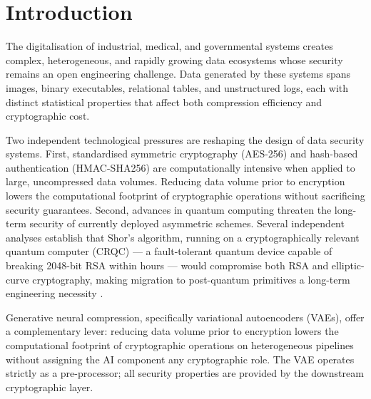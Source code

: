 \documentclass[twocolumn]{article}
\begin{document}
\section{Introduction}

The digitalisation of industrial, medical, and governmental systems creates
complex, heterogeneous, and rapidly growing data ecosystems whose security remains
an open engineering challenge. Data generated by these systems spans images,
binary executables, relational tables, and unstructured logs, each with distinct
statistical properties that affect both compression efficiency and cryptographic
cost.

Two independent technological pressures are reshaping the design of data security
systems. First, standardised symmetric cryptography (AES-256) and hash-based
authentication (HMAC-SHA256) are computationally intensive when applied to large,
uncompressed data volumes. Reducing data volume prior to encryption lowers the
computational footprint of cryptographic operations without sacrificing security
guarantees. Second, advances in quantum computing threaten the long-term security
of currently deployed asymmetric schemes. Several independent analyses establish
that Shor's algorithm, running on a cryptographically relevant quantum computer
(CRQC) --- a fault-tolerant quantum device capable of breaking 2048-bit RSA
within hours --- would compromise both RSA and elliptic-curve cryptography, making
migration to post-quantum primitives a long-term engineering necessity
\cite{natacad2019, bernstein2017}.

Generative neural compression, specifically variational autoencoders (VAEs),
offer a complementary lever: reducing data volume prior to encryption lowers the
computational footprint of cryptographic operations on heterogeneous pipelines
without assigning the AI component any cryptographic role. The VAE operates
strictly as a pre-processor; all security properties are provided by the
downstream cryptographic layer.
\end{document}
